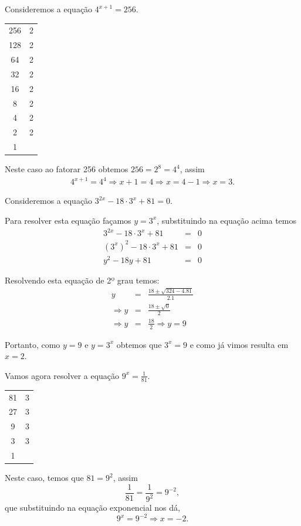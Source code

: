  \begin{exem}
  Consideremos a equação $4^{x+1}= 256$.

  \begin{tabular}{c|c}
   256 & 2 \\
   128 & 2 \\
   64  & 2 \\
   32  & 2 \\
   16  & 2 \\
   8   & 2 \\
   4   & 2 \\
   2   & 2 \\
   1   &   \\
  \end{tabular}

  Neste caso ao fatorar 256 obtemos $256=2^8 =4^4$, assim
  \begin{eqnarray*}
  4^{x+1}= 4^4 \Rightarrow x+1= 4 \Rightarrow x= 4-1 \Rightarrow x=3.
  \end{eqnarray*}

 \end{exem}

 \begin{exem}
  Consideremos a equação $3^{2x}- 18\cdot 3^x + 81=0$.

  Para resolver esta equação façamos $y= 3^x$, substituindo na equação acima temos
  \begin{eqnarray*}
   3^{2x} - 18\cdot 3^x + 81&=& 0 \\
   (3^x)^2 - 18\cdot 3^x + 81&=& 0 \\
   y^2 - 18y + 81 &=& 0
  \end{eqnarray*}

  Resolvendo esta equação de 2º grau temos:
  \begin{eqnarray*}
   y &=& \frac{18 \pm \sqrt{324 - 4.81}}{2.1} \\
   \Rightarrow y&=& \frac{18 \pm \sqrt{0}}{2} \\
   \Rightarrow y&=& \frac{18}{2} \Rightarrow y= 9
  \end{eqnarray*}

  Portanto, como $y= 9$ e $y= 3^x$ obtemos que $3^x= 9$ e como já vimos resulta em $x= 2$.

 \end{exem}

 \begin{exem}
  Vamos agora resolver a equação $9^x= \frac{1}{81}$.

  \begin{tabular}{c|c}
   81 & 3 \\
   27 & 3 \\
   9  & 3 \\
   3  & 3 \\
   1  &   \\
  \end{tabular}

  Neste caso, temos que $81= 9^2$, assim
  \[\frac{1}{81}= \frac{1}{9^2}= 9^{-2} ,\]
  que substituindo na equação exponencial nos dá,
  \[9^x= 9^{-2} \Rightarrow x= -2 .\]
 \end{exem}

